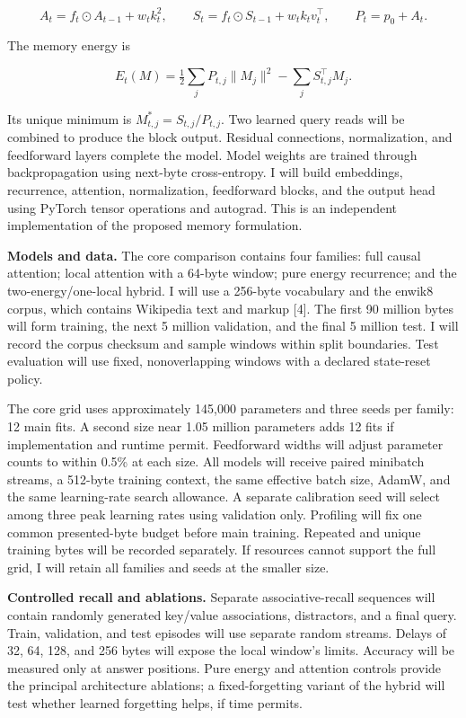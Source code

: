 \documentclass[11pt,letterpaper]{article}
\begin{document}
\[
A_t=f_t\odot A_{t-1}+w_t k_t^2,\qquad
S_t=f_t\odot S_{t-1}+w_t k_t v_t^\top,\qquad
P_t=p_0+A_t.
\]

The memory energy is

\[
E_t(M)=\tfrac12\sum_j P_{t,j}\|M_j\|^2-\sum_j S_{t,j}^{\top}M_j.
\]

Its unique minimum is \(M_{t,j}^{*}=S_{t,j}/P_{t,j}\). Two learned query reads will be combined to produce the block output. Residual connections, normalization, and feedforward layers complete the model. Model weights are trained through backpropagation using next-byte cross-entropy. I will build embeddings, recurrence, attention, normalization, feedforward blocks, and the output head using PyTorch tensor operations and autograd. This is an independent implementation of the proposed memory formulation.

\textbf{Models and data.} The core comparison contains four families: full causal attention; local attention with a 64-byte window; pure energy recurrence; and the two-energy/one-local hybrid. I will use a 256-byte vocabulary and the enwik8 corpus, which contains Wikipedia text and markup [4]. The first 90 million bytes will form training, the next 5 million validation, and the final 5 million test. I will record the corpus checksum and sample windows within split boundaries. Test evaluation will use fixed, nonoverlapping windows with a declared state-reset policy.

The core grid uses approximately 145,000 parameters and three seeds per family: 12 main fits. A second size near 1.05 million parameters adds 12 fits if implementation and runtime permit. Feedforward widths will adjust parameter counts to within 0.5\% at each size. All models will receive paired minibatch streams, a 512-byte training context, the same effective batch size, AdamW, and the same learning-rate search allowance. A separate calibration seed will select among three peak learning rates using validation only. Profiling will fix one common presented-byte budget before main training. Repeated and unique training bytes will be recorded separately. If resources cannot support the full grid, I will retain all families and seeds at the smaller size.

\textbf{Controlled recall and ablations.} Separate associative-recall sequences will contain randomly generated key/value associations, distractors, and a final query. Train, validation, and test episodes will use separate random streams. Delays of 32, 64, 128, and 256 bytes will expose the local window's limits. Accuracy will be measured only at answer positions. Pure energy and attention controls provide the principal architecture ablations; a fixed-forgetting variant of the hybrid will test whether learned forgetting helps, if time permits.
\end{document}
